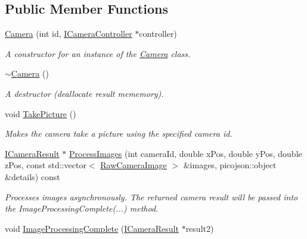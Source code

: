\subsection*{Public Member Functions}
\begin{DoxyCompactItemize}
\item 
\mbox{\label{classCamera_aaf2867de230aff68de7d10deae302e8d}} 
\hyperlink{classCamera_aaf2867de230aff68de7d10deae302e8d}{Camera} (int id, \hyperlink{classICameraController}{I\+Camera\+Controller} $\ast$controller)
\begin{DoxyCompactList}\small\item\em A constructor for an instance of the \hyperlink{classCamera}{Camera} class. \end{DoxyCompactList}\item 
\mbox{\label{classCamera_ad1897942d0ccf91052386388a497349f}} 
\hyperlink{classCamera_ad1897942d0ccf91052386388a497349f}{$\sim$\+Camera} ()
\begin{DoxyCompactList}\small\item\em A destructor (deallocate result mememory). \end{DoxyCompactList}\item 
\mbox{\label{classCamera_a70dfc7f06d6e12855afadd358831cf3a}} 
void \hyperlink{classCamera_a70dfc7f06d6e12855afadd358831cf3a}{Take\+Picture} ()
\begin{DoxyCompactList}\small\item\em Makes the camera take a picture using the specified camera id. \end{DoxyCompactList}\item 
\hyperlink{classICameraResult}{I\+Camera\+Result} $\ast$ \hyperlink{classCamera_a792611ad34a1c595b61b7c72ce1d5e32}{Process\+Images} (int camera\+Id, double x\+Pos, double y\+Pos, double z\+Pos, const std\+::vector$<$ \hyperlink{structRawCameraImage}{Raw\+Camera\+Image} $>$ \&images, picojson\+::object \&details) const
\begin{DoxyCompactList}\small\item\em Processes images asynchronously. The returned camera result will be passed into the Image\+Processing\+Complete(...) method. \end{DoxyCompactList}\item 
void \hyperlink{classCamera_aa44e2101b2cf0a75ab1fd498f3f7adea}{Image\+Processing\+Complete} (\hyperlink{classICameraResult}{I\+Camera\+Result} $\ast$result2)

\end{DoxyCompactItemize}
